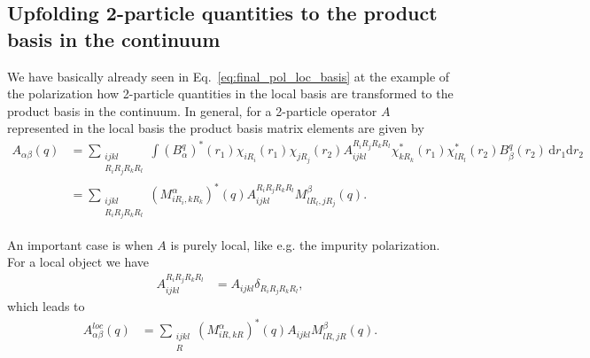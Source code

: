 \documentclass[12pt,a4paper]{scrartcl}
\numberwithin{equation}{section}
\begin{document}
\subsection{Upfolding 2-particle quantities to the product basis in the continuum}
We have basically already seen in Eq.~\eqref{eq:final_pol_loc_basis}
at the example of the polarization how 2-particle quantities in the 
local basis are transformed to the product basis in the continuum.
In general, for a 2-particle operator $A$ represented in the local
basis the product basis matrix elements are given by
\begin{align}
 A_{\alpha\beta}(q)
 &= \sum_{\substack{ijkl\\R_iR_jR_kR_l}}\int (B^q_{\alpha})^*(r_1)
         \chi_{iR_i}(r_1)\chi_{jR_j}(r_2) 
         A^{R_iR_jR_kR_l}_{ijkl} \chi^*_{kR_k}(r_1)\chi^*_{lR_l}(r_2)
          B^q_{\beta}(r_2) \, \mathrm{d}r_1\mathrm{d}r_2 \\
%
&= \sum_{\substack{ijkl\\R_iR_jR_kR_l}}
        (M^{\alpha}_{iR_i,kR_k})^*(q)
         A^{R_iR_jR_kR_l}_{ijkl} M^{\beta}_{lR_l,jR_j}(q).
\end{align}

An important case is when $A$ is purely local, like e.g.
 the impurity polarization. For a local object we have
\begin{align}
 A^{R_iR_jR_kR_l}_{ijkl} 
 &= A_{ijkl} \delta_{R_iR_jR_kR_l}, 
\end{align}
which leads to
\begin{align}
 A^{loc}_{\alpha\beta}(q)
%
&= \sum_{\substack{ijkl\\R}}
        (M^{\alpha}_{iR,kR})^*(q)
         A_{ijkl} M^{\beta}_{lR,jR}(q).
\end{align}
\end{document}
